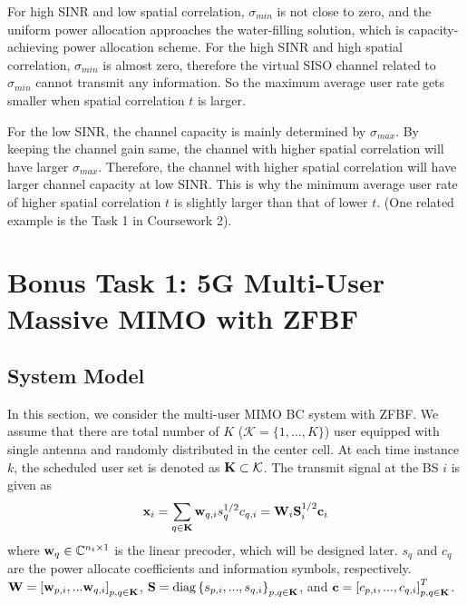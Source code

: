 \documentclass[10pt,conference]{IEEEtran}
\begin{document}
For high SINR and low spatial correlation, $\sigma_{min}$ is 
not close to zero, and the uniform power allocation approaches the water-filling solution, which 
is capacity-achieving power allocation scheme. For the high SINR and high spatial correlation, $\sigma_{min}$
is almost zero, therefore the virtual SISO channel related to $\sigma_{min}$ cannot transmit any information.
So the maximum average user rate gets smaller when spatial correlation $t$ is larger.

For the low SINR, the channel capacity is mainly determined by $\sigma_{max}$. By keeping 
the channel gain same, the channel with higher spatial correlation will have larger $\sigma_{max}$.
Therefore, the channel with higher spatial correlation will have larger channel capacity at low SINR.
This is why the minimum average user rate of higher spatial correlation $t$ is slightly larger than 
that of lower $t$. (One related example is the Task 1 in Coursework 2).






\section{Bonus Task 1: 5G Multi-User Massive MIMO with ZFBF}
\subsection{System Model}

In this section, we consider the multi-user MIMO BC system with ZFBF.
We assume that there are total number of $K$ ($\mathcal{K} = \{1,...,K\}$) 
user equipped with single antenna and randomly distributed in the center 
cell. At each time instance $k$, the scheduled user set is denoted as ${\bf{K}} \subset \mathcal{K}$.
The transmit signal at the BS $i$ is given as
\begin{equation}
    {\bf{x}}_i = \sum_{q \in \bf{K}} {\bf{w}}_{q,i} s_q^{1/2} c_{q,i} = {\bf{W}}_i {\bf{S}}^{1/2}_i {\bf{c}}_i \label{eq22}
\end{equation}
where ${\bf{w}}_q \in \mathbb{C}^{n_t \times 1}$ is the linear precoder, which
will be designed later. $s_q$ and $c_q$ are the power allocate coefficients and 
information symbols, respectively. ${\bf{W}} = \left[{\bf{w}}_{p,i},...{\bf{w}}_{q,i}\right]_{p,q \in {\bf{K}}}$,
${\bf{S}}=\text{diag} \left\{ s_{p,i},...,s_{q,i} \right\}_{p,q \in {\bf{K}}}$, and
${\bf{c}} = \left[ c_{p,i},...,c_{q,i} \right]^T_{p,q \in {\bf{K}}}$.
\end{document}
